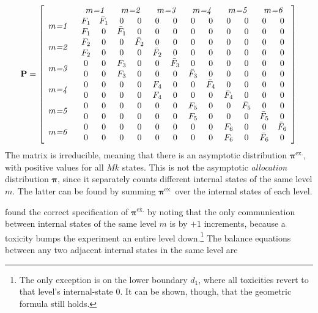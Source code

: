 \begin{equation}\label{eq:kPmat}
\mathbf{P}=\left[\begin{array}{p{1cm}cccccccccccc}
& \multicolumn{2}{c}{\emph{$m$=1}} & \multicolumn{2}{c}{\emph{$m$=2}}& \multicolumn{2}{c}{\emph{$m$=3}}& \multicolumn{2}{c}{\emph{$m$=4}}& \multicolumn{2}{c}{\emph{$m$=5}}& \multicolumn{2}{c}{\emph{$m$=6}} \\
  \multirow{2}{*}{\emph{$m$=1}} &  F_1 &\bar{F}_1 &0 &0 &0 &0 &0 &0 &0 &0 &0 & 0\\
   &  F_1 &0         &\bar{F}_1 &0 &0 &0 &0 &0 &0 &0 &0& 0\\
  \multirow{2}{*}{\emph{$m$=2}} &  F_2 &0 &0 &\bar{F}_2 &0 &0 &0 &0 &0 &0 &0& 0\\
 &   F_2 &0 &0 &0 &\bar{F}_2  &0 &0 &0 &0 &0 &0& 0\\
  \multirow{2}{*}{\emph{$m$=3}} &  0    &0 &F_3 &0 &0   &\bar{F}_3 &0 &0 &0 &0 &0& 0\\
  &  0    &0 &F_3 &0 &0   &0 &\bar{F}_3 &0 &0 &0 &0& 0\\
  \multirow{2}{*}{\emph{$m$=4}} &  0    &0 &0   &0 &F_4 &0 & 0&\bar{F}_4 &0 &0 &0 &0\\
  &  0    &0 &0   &0 &F_4 &0 &0      & 0   &\bar{F}_4 &0 &0 &0\\
  \multirow{2}{*}{\emph{$m$=5}} &  0    &0 &0   &0 &0   &0 &F_5    & 0   &0 &\bar{F}_5 &0 &0\\
  &  0    &0 &0   &0 &0   &0 &F_5    & 0   &0 &0 &\bar{F}_5 &0\\
 \multirow{2}{*}{\emph{$m$=6}} &   0    &0 &0   &0 &0   &0 &0         &0 &F_6 &0 & 0&\bar{F}_6\\
  &  0    &0 &0   &0 &0   &0 &0         &0 &F_6 & 0 &\bar{F}_6 & 0\\
\end{array}\right]
\end{equation}
The matrix is irreducible, meaning that there is an asymptotic distribution $\boldsymbol{\pi}^{\textrm{ex.}}$, with positive values for all $Mk$ states. This is not the asymptotic \emph{allocation} distribution $\boldsymbol{\pi}$, since it separately counts different internal states of the same level $m$. The latter can be found by summing $\boldsymbol{\pi}^{\textrm{ex.}}$ over the internal states of each level.

\cite{Gezm:Geom:1996} found the correct specification of $\boldsymbol{\pi}^{\textrm{ex.}}$ by noting that the only communication between internal states of the same level $m$ is by $+1$ increments, because a toxicity bumps the experiment an entire level down.\footnote{The only exception is on the lower boundary $d_1$, where all toxicities revert to that level's internal-state $0$. It can be shown, though, that the geometric formula still holds.}  The balance equations between any two adjacent internal states in the same level are

